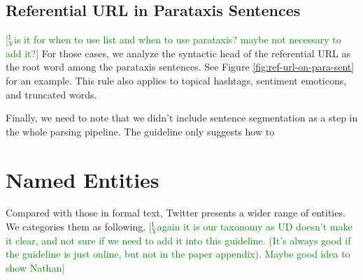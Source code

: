 \documentclass[11pt,a4paper]{article}
\newcommand{\yicomment}[1]{\textcolor{green}{[$_\mathrm{Y}^\mathrm{I}$#1]}}
\begin{document}
\subsection{Referential URL in Parataxis Sentences}\yicomment{is it for when to use list and when to use parataxis? maybe not necessary to add it?}
For those cases, we analyze the syntactic head of the referential URL
as the root word among the parataxis sentences.
See Figure \ref{fig:ref-url-on-para-sent} for an example.
This rule also applies to topical hashtags, sentiment emoticons, and truncated words.

Finally, we need to note that we didn't include sentence segmentation
as a step in the whole parsing pipeline.
The guideline only suggests how to 

\section{Named Entities}
Compared with those in formal text, Twitter presents 
a wider range of entities.
We categories them as following. \yicomment{again it is our taxonomy as UD doesn't make it clear, and not sure if we need to add it into this guideline. (It's always good if the guideline is just online, but not in the paper appendix). Maybe good idea to show Nathan}
\end{document}

